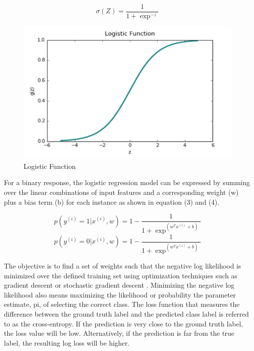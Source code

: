\documentclass{llncs}
\begin{document}
\begin{equation}
\sigma(Z) = \frac{1}{1+\exp^{-z}}
\end{equation}

\begin{figure}
\centering
\includegraphics[scale=1.0]{sigmoid.png}
\caption{Logistic Function}
\end{figure}

For a binary response, the logistic regression model can be expressed by summing over the linear combinations of input features and a corresponding weight (w) plus a bias term (b) for each instance as shown in equation (3) and (4).

\begin{equation}
p(y^{(i)} = 1 | x^{(i)},w) = 1-  \frac{1}{1+\exp^{(w^{T}x^{(i)}+b)}}
\end{equation}
\begin{equation}
p(y^{(i)} = 0 | x^{(i)},w) = 1-  \frac{1}{1+\exp^{(w^{T}x^{(i)}+b)}}
\end{equation}

The objective is to find a set of weights such that the negative log likelihood is minimized over the defined training set using optimization techniques such as gradient descent or stochastic gradient descent \cite{ng}. Minimizing the negative log likelihood also means maximizing the likelihood or probability the parameter estimate, pi, of selecting the correct class. The loss function that measures the difference between the ground truth label and the predicted class label is referred to as the cross-entropy. If the prediction is very close to the ground truth label, the loss value will be low. Alternatively, if the prediction is far from the true label, the resulting log loss will be higher.
\end{document}
